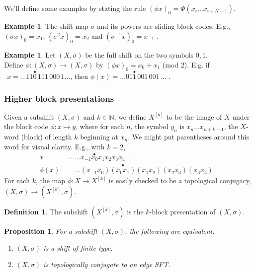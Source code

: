 \documentclass{amsart}
\newtheorem{prop}[equation]{Proposition}
\theoremstyle{definition}
\newtheorem{de}[equation]{Definition}
\newtheorem{ex}[equation]{Example}
\theoremstyle{definition}
\newcommand{\N}{\mathbb N}
\newcommand{\overd}{\overset{\bullet}}
\numberwithin{equation}{subsection}
\begin{document}
We'll define some examples  by stating
the rule
     $(\phi x)_0 = \Phi (x_i \dots x_{i+N-1})$.
\begin{ex}
The shift map $\sigma$  and its powers are
sliding block codes. E.g.,
$(\sigma x)_0 = x_1$,
$(\sigma^2 x)_0 = x_2$  and $(\sigma^{-1} x)_0 = x_{-1}$ .
\end{ex}
\begin{ex}
Let $(X,\sigma)$ be the full shift on the two symbols $0,1$.
\\ Define  $\phi:(X,\sigma)\to (X,\sigma)$ by
$(\phi x)_0 = x_0 +x_1 $ (mod 2).
E.g. if $\ \  x = \dots 11\overset{\bullet}{0}\, 111\, 000\, 1 \dots $,
then $\phi (x) = \dots 01\overset{\bullet}{1}\, 001\, 001 \,
\dots $ .
\end{ex}
\subsubsection{Higher block  presentations}

Given a subshift $(X,\sigma)$ and $k\in \N$,
we define $X^{[k]}$ to be the image of $X$ under the block code
$\phi: x\mapsto y$, where for each $n$, the symbol $y_n $ is
$x_n\dots x_{n+k-1} $, the $X$-word (block) of length $k$
beginning at $x_n$.
We might put
parentheses around this word  for visual
clarity. E.g., with $k=2$,
\begin{align*}
x & = \dots x_{-1} \overd{x_0} x_1 x_2 x_3 x_4 \dots  \\
\phi (x) & = \dots (x_{-1}  x_0 )
\overd{(x_{0}  x_1 )}
(x_{1}  x_2 ) (x_{2}  x_3 )
(x_{3}  x_4)   \dots  \end{align*}
      For each $k$,  the map
      $\phi : X\to X^{[k]}$ is easily checked to be a topological conjugacy,
      $(X,\sigma) \to (X^{[k]}, \sigma)$. \\
\begin{de} The subshift      $(X^{[k]}, \sigma)$ is  the $k$-block presentation
      of $(X,\sigma)$.
\end{de}


\begin{prop}\label{conjugatetoedgesft} For a subshift $(X, \sigma)$, the following are equivalent.
  \begin{enumerate}
  \item
    $(X, \sigma)$ is a shift of finite type.
  \item
    $(X, \sigma)$  is topologically conjugate to an edge SFT.
    \end{enumerate}
\end{prop}
\end{document}
